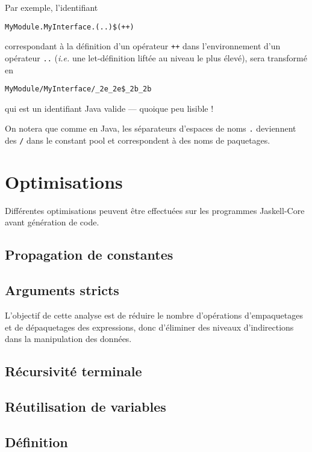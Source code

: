 Par exemple, l'identifiant 
\begin{verbatim}
MyModule.MyInterface.(..)$(++)
\end{verbatim}
correspondant \`a la d\'efinition d'un op\'erateur \texttt{++} dans
l'environnement d'un op\'erateur \texttt{..} (\emph{i.e.} une
let-d\'efinition lift\'ee au niveau le plus \'elev\'e), sera transform\'e en
\begin{verbatim}
MyModule/MyInterface/_2e_2e$_2b_2b
\end{verbatim}
qui est un identifiant Java valide --- quoique peu lisible !

On notera que comme en Java, les s\'eparateurs d'espaces de noms
\texttt{.} deviennent des \texttt{/} dans le constant pool et
correspondent \`a des noms de paquetages. 

\section{Optimisations}

Diff\'erentes optimisations peuvent \^etre effectu\'ees sur les programmes
Jaskell-Core avant g\'en\'eration de code. 

\subsection{Propagation de constantes}

\subsection{Arguments stricts}

L'objectif de cette analyse est de r\'eduire le nombre d'op\'erations
d'empaquetages et de d\'epaquetages des expressions, donc d'\'eliminer des
niveaux d'indirections dans la manipulation des donn\'ees. 

\subsection{R\'ecursivit\'e terminale}

\subsection{R\'eutilisation de variables}


\subsection{D\'efinition}

